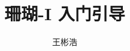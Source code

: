 \documentclass{thesis-uestc}
\title{珊瑚-I 入门引导}{aCoral-I Guide Manual}
\author{王彬浩}{Wang BinHao}
\begin{document}
\makecover





\thesistableofcontents




\end{document}
